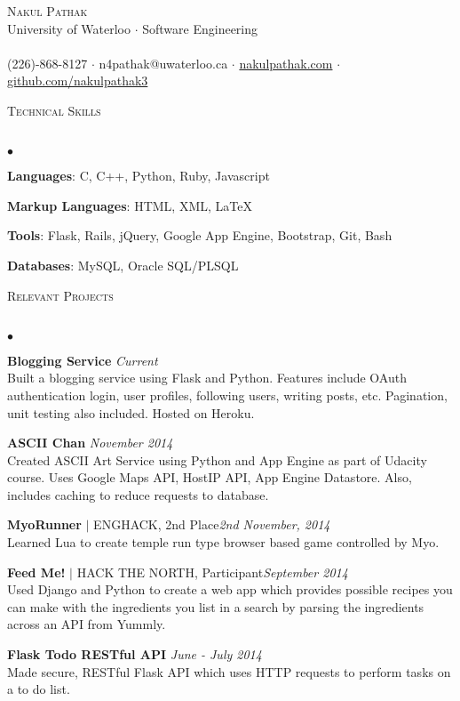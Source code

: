 \documentclass{article}
\newcommand{\lineunder}{\vspace*{-8pt} \\ \hspace*{-18pt} \hrulefill \\}
\newcommand{\header}[1]{{\hspace*{-15pt}\vspace*{6pt} \textsc{#1}} \vspace*{-6pt} \lineunder}
\newenvironment{achievements}{\begin{list}{$\bullet$}{\topsep 0pt \itemsep -1.5pt \leftmargin 5pt}}{\vspace*{4pt}\end{list}}
\begin{document}
\small
\smallskip
\vspace*{-45pt}

\begin{center}
	{\huge \scshape {Nakul Pathak}} \\
\vspace*{6pt} 
{\fontsize{11}{1}\selectfont University of Waterloo $\cdot$ Software Engineering} \\
\vspace{-5pt}
\hrulefill \\
(226)-868-8127 \hfill $\cdot$ n4pathak@uwaterloo.ca \hfill $\cdot$   \url{nakulpathak.com}  \hfill $\cdot$ \url{github.com/nakulpathak3}
\end{center}


\vspace{7pt}
\header{\normalsize Technical Skills}
\begin{achievements}
\item \textbf{Languages}: C, C++, Python, Ruby, Javascript
\item \textbf{Markup Languages}: HTML, XML, LaTeX
\item \textbf{Tools}: Flask, Rails, jQuery, Google App Engine, Bootstrap, Git, Bash
\item \textbf{Databases}: MySQL, Oracle SQL/PLSQL
\end{achievements}

\vspace{7pt}

\header{\normalsize Relevant Projects}
\begin{achievements}
\item \textbf{Blogging Service}  \hfill \textit {Current}
\\ Built a blogging service using Flask and Python. Features include OAuth authentication login, user profiles, following users, writing posts, etc. Pagination, unit testing also included. Hosted on Heroku.
\item \textbf{ASCII Chan} \hfill \textit {November 2014}
\\ Created ASCII Art Service using Python and App Engine as part of Udacity course. Uses Google Maps API, HostIP API, App Engine Datastore. Also, includes caching to reduce requests to database. 
\item\textbf{MyoRunner} {$|$ \scriptsize ENGHACK, 2nd Place}\hfill\textit{2nd November, 2014}
\\ Learned Lua to create temple run type browser based game controlled by Myo.
\item \textbf{Feed Me!} {$|$ \scriptsize HACK THE NORTH, Participant}\hfill \textit {September 2014}
\\ Used Django and Python to create a web app which provides possible recipes you can make with the ingredients you list in a search by parsing the ingredients across an API from Yummly.
\item \textbf{Flask Todo RESTful API} \hfill \textit {June - July 2014}
\\ Made secure, RESTful Flask API which uses HTTP requests to perform tasks on a to do list.
\end{achievements}
\end{document}
